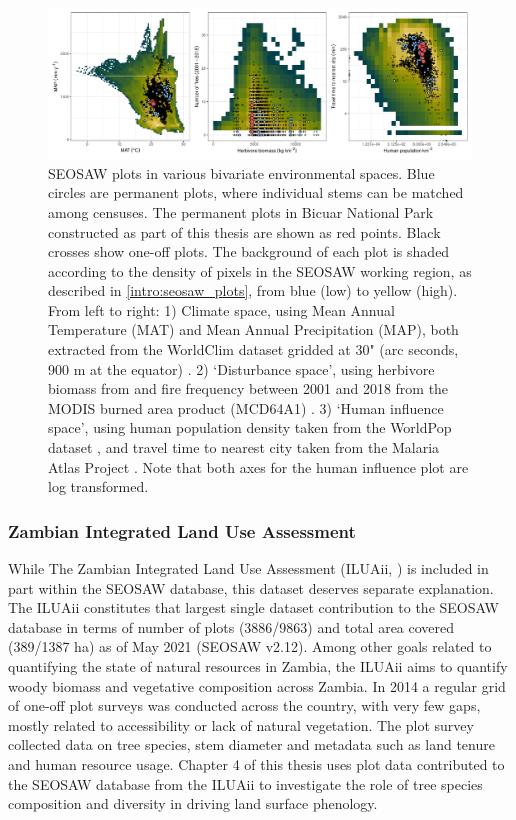 \begin{refsection}
\begin{figure}[tb]
	\includegraphics[width=\textwidth]{img/seosaw_space_all}
	\caption[Distribution of SEOSAW plots in environmental space]{SEOSAW plots in various bivariate environmental spaces. Blue circles are permanent plots, where individual stems can be matched among censuses. The permanent plots in Bicuar National Park constructed as part of this thesis are shown as red points. Black crosses show one-off plots. The background of each plot is shaded according to the density of pixels in the SEOSAW working region, as described in \autoref{intro:seosaw_plots}, from blue (low) to yellow (high). From left to right: 1) Climate space, using Mean Annual Temperature (MAT) and Mean Annual Precipitation (MAP), both extracted from the WorldClim dataset gridded at 30" (arc seconds, \textapprox{}900 m at the equator) \citep{Fick2017}. 2) `Disturbance space', using herbivore biomass from \citet{Hempson2017} and fire frequency between 2001 and 2018 from the MODIS burned area product (MCD64A1) \citep{MCD64A1}. 3) `Human influence space', using human population density taken from the WorldPop dataset \citep{Linard2012}, and travel time to nearest city taken from the Malaria Atlas Project \citep{Meijer2018}. Note that both axes for the human influence plot are log transformed.}
	\label{intro:seosaw_space_all}
\end{figure}

\subsubsection{Zambian Integrated Land Use Assessment}
\label{intro:sssec:iluaii}

While The Zambian Integrated Land Use Assessment (ILUAii, \citealt{Mukosha2009}) is included in part within the SEOSAW database, this dataset deserves separate explanation. The ILUAii constitutes that largest single dataset contribution to the SEOSAW database in terms of number of plots (3886/9863) and total area covered (389/1387 ha) as of May 2021 (SEOSAW v2.12). Among other goals related to quantifying the state of natural resources in Zambia, the ILUAii aims to quantify woody biomass and vegetative composition across Zambia. In 2014 a regular grid of one-off plot surveys was conducted across the country, with very few gaps, mostly related to accessibility or lack of natural vegetation. The plot survey collected data on tree species, stem diameter and metadata such as land tenure and human resource usage. Chapter 4 of this thesis uses plot data contributed to the SEOSAW database from the ILUAii to investigate the role of tree species composition and diversity in driving land surface phenology. 


\end{refsection}
